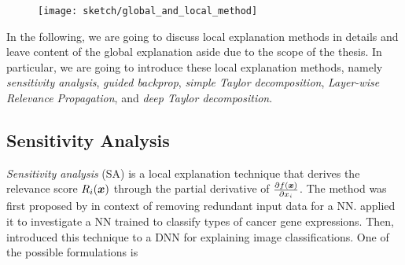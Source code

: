  \begin{figure}
\centering
\texttt{[image: sketch/global\_and\_local\_method]}
\label{fig:comparision_between_global_and_local_analysis}
\end{figure}

In the following, we are going to discuss local explanation methods in details and leave content of the global explanation aside due to the scope of the thesis. In particular, we are going to introduce these local explanation methods, namely \textit{sensitivity analysis}, \textit{guided backprop}, \textit{simple Taylor decomposition}, \textit{Layer-wise Relevance Propagation}, and \textit{deep Taylor decomposition}.


%

\subsection{Sensitivity Analysis}
\textit{Sensitivity analysis} (SA) is a local explanation technique that derives the relevance score $R_i(\boldsymbol{x})$ through the  partial derivative of $\frac{\partial f(\patvector{x})}{ \partial x_i }$.  The method was first proposed by \citet{ZuradaSensitivityAnalysisMinimization1994} in context of removing redundant input data for a NN. \citet{KhanClassificationdiagnosticprediction2001} applied it to investigate a NN trained to classify types of cancer gene expressions. Then, \citet{SimonyanDeepConvolutionalNetworks2013} introduced this technique to a DNN for explaining image classifications. One of the possible formulations is 

